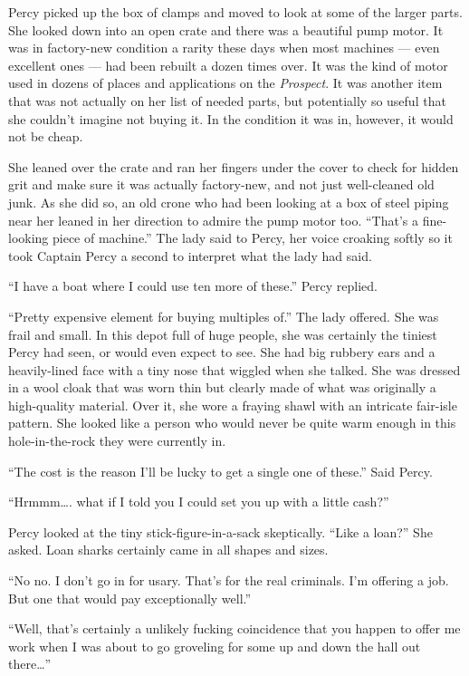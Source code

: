 \documentclass[]{scrbook}
\begin{document}
Percy picked up the box of clamps and moved to look at some of the
larger parts. She looked down into an open crate and there was a
beautiful pump motor. It was in factory-new condition a rarity these
days when most machines --- even excellent ones --- had been rebuilt a
dozen times over. It was the kind of motor used in dozens of places and
applications on the \emph{Prospect}. It was another item that was not
actually on her list of needed parts, but potentially so useful that she
couldn't imagine not buying it. In the condition it was in, however, it
would not be cheap.

She leaned over the crate and ran her fingers under the cover to check
for hidden grit and make sure it was actually factory-new, and not just
well-cleaned old junk. As she did so, an old crone who had been looking
at a box of steel piping near her leaned in her direction to admire the
pump motor too. ``That's a fine-looking piece of machine.'' The lady
said to Percy, her voice croaking softly so it took Captain Percy a
second to interpret what the lady had said.

``I have a boat where I could use ten more of these.'' Percy replied.

``Pretty expensive element for buying multiples of.'' The lady offered.
She was frail and small. In this depot full of huge people, she was
certainly the tiniest Percy had seen, or would even expect to see. She
had big rubbery ears and a heavily-lined face with a tiny nose that
wiggled when she talked. She was dressed in a wool cloak that was worn
thin but clearly made of what was originally a high-quality material.
Over it, she wore a fraying shawl with an intricate fair-isle pattern.
She looked like a person who would never be quite warm enough in this
hole-in-the-rock they were currently in.

``The cost is the reason I'll be lucky to get a single one of these.''
Said Percy.

``Hrmmm\ldots{}. what if I told you I could set you up with a little
cash?''

Percy looked at the tiny stick-figure-in-a-sack skeptically. ``Like a
loan?'' She asked. Loan sharks certainly came in all shapes and sizes.

``No no. I don't go in for usary. That's for the real criminals. I'm
offering a job. But one that would pay exceptionally well.''

``Well, that's certainly a unlikely fucking coincidence that you happen
to offer me work when I was about to go groveling for some up and down
the hall out there\ldots{}''
\end{document}
